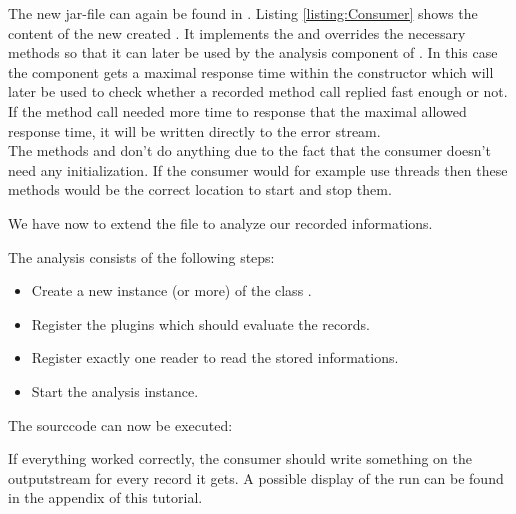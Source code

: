 		The new jar-file can again be found in . Listing \ref{listing:Consumer} shows the content of the new created . It implements the  and overrides the necessary methods so that it can later be used by the analysis component of \Kieker. In this case the component gets a maximal response time within the constructor which will later be used to check whether a recorded method call replied fast enough or not. If the method call needed more time to response that the maximal allowed response time, it will be written directly to the error stream.\\
		The methods  and  don't do anything due to the fact that the consumer doesn't need any initialization. If the consumer would for example use threads then these methods would be the correct location to start and stop them.

		\setJavaCodeListing       
		

		We have now to extend the file  to analyze our recorded informations.

		\setJavaCodeListing       
		

		\notify The analysis consists of the following steps:
		\begin{itemize}
			\item Create a new instance (or more) of the class .
			\item Register the plugins which should evaluate the records.
			\item Register exactly one reader to read the stored informations.
			\item Start the analysis instance.
		\end{itemize}
		The sourccode can now be executed:

		\setBashListing 		
				

		If everything worked correctly, the consumer should write something on the outputstream for every record it gets. A possible display of the run can be found in the appendix of this tutorial. 